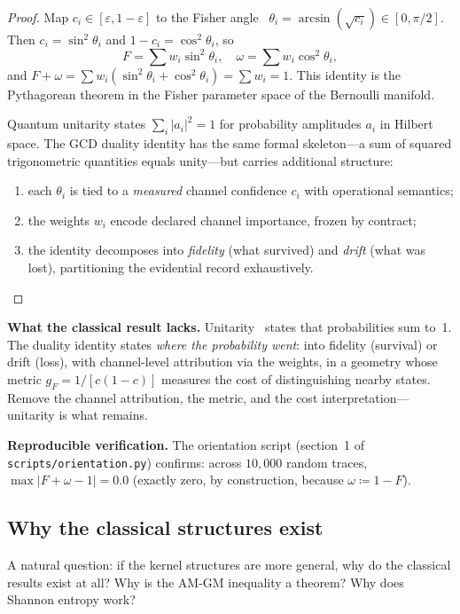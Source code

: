 \documentclass[
  aps,
  prd,
  twocolumn,
  superscriptaddress,
  nofootinbib,
  floatfix
]{revtex4-2}
\newcommand{\eps}{\varepsilon}
\newcommand{\beq}{\begin{equation}}
\newcommand{\eeq}{\end{equation}}
\begin{document}
\begin{proof}
Map $c_i \in [\eps, 1{-}\eps]$ to the Fisher
angle~\cite{fisher1925,amari2016information}
$\theta_i = \arcsin(\sqrt{c_i}) \in [0, \pi/2]$.  Then
$c_i = \sin^2\theta_i$ and $1 - c_i = \cos^2\theta_i$, so
\beq
  F = \sum w_i \sin^2\!\theta_i, \quad
  \omega = \sum w_i \cos^2\!\theta_i,
\eeq
and $F + \omega = \sum w_i(\sin^2\!\theta_i +
\cos^2\!\theta_i) = \sum w_i = 1$.  This identity is
the Pythagorean theorem in the Fisher parameter space of
the Bernoulli manifold.

Quantum unitarity states $\sum_i |a_i|^2 = 1$ for
probability amplitudes $a_i$ in Hilbert space.  The GCD
duality identity has the same formal skeleton---a sum of
squared trigonometric quantities equals unity---but carries
additional structure:
\begin{enumerate}[leftmargin=*,label=(\alph*)]
\item each $\theta_i$ is tied to a \emph{measured}
  channel confidence $c_i$ with operational semantics;
\item the weights $w_i$ encode declared channel
  importance, frozen by contract;
\item the identity decomposes into \emph{fidelity}
  (what survived) and \emph{drift} (what was lost),
  partitioning the evidential record exhaustively.
\end{enumerate}
\end{proof}

\noindent\textbf{What the classical result lacks.}
Unitarity~\cite{dirac1930principles,weinberg1995qft1} states
that probabilities sum to~1.  The duality identity states
\emph{where the probability went}: into fidelity (survival)
or drift (loss), with channel-level attribution via the
weights, in a geometry whose metric
$g_F = 1/[c(1{-}c)]$ measures the cost of distinguishing
nearby states.  Remove the channel attribution, the metric,
and the cost interpretation---unitarity is what remains.

\noindent\textbf{Reproducible verification.}
The orientation script (section~1 of
\texttt{scripts/orientation.py}) confirms: across $10{,}000$
random traces, $\max|F + \omega - 1| = 0.0$ (exactly zero,
by construction, because $\omega \coloneqq 1 - F$).

\subsection{Why the classical structures exist}

A natural question: if the kernel structures are more general,
why do the classical results exist at all?  Why is the
AM-GM inequality a theorem?  Why does Shannon entropy work?
\end{document}
